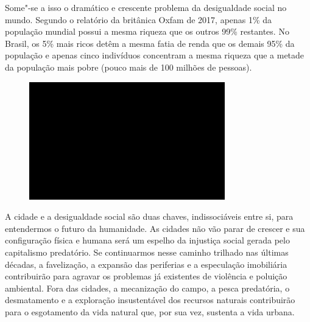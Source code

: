 Some"-se a isso o dramático e crescente problema da desigualdade social
no mundo. Segundo o relatório da  britânica Oxfam de 2017, apenas 1\%
da população mundial possui a mesma riqueza que os outros 99\%
restantes. No Brasil, os 5\% mais ricos detêm a mesma fatia de renda que
os demais 95\% da população e apenas cinco indivíduos concentram a mesma
riqueza que a metade da população mais pobre (pouco mais de 100 milhões
de pessoas).

\begin{figure}[!ht]
\centering
 \includegraphics[width=85mm]{./imgs/im1.jpg}
\caption{\tiny{}}
\end{figure}

A cidade e a desigualdade social são duas chaves, indissociáveis entre
si, para entendermos o futuro da humanidade. As cidades não vão parar de
crescer e sua configuração física e humana será um espelho da injustiça
social gerada pelo capitalismo predatório. Se continuarmos nesse caminho
trilhado nas últimas décadas, a favelização, a expansão das periferias e
a especulação imobiliária contribuirão para agravar os problemas já
existentes de violência e poluição ambiental. Fora das cidades, a
mecanização do campo, a pesca predatória, o desmatamento e a exploração
insustentável dos recursos naturais contribuirão para o esgotamento da
vida natural que, por sua vez, sustenta a vida urbana.

